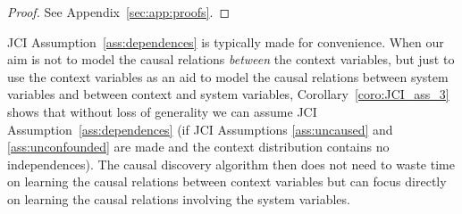 \documentclass[twoside,11pt]{article}
\begin{document}
\begin{corollary}\label{coro:JCI_ass_3}
\cmdCorollaryJCIAssC
\end{corollary}
\begin{proof}
  See Appendix~\ref{sec:app:proofs}.
\end{proof}
JCI Assumption~\ref{ass:dependences} is typically made for convenience.
When our aim is not to model the causal relations \emph{between} the context variables, but just to use the context variables as an aid to model the causal relations between system variables and between context and system variables, Corollary~\ref{coro:JCI_ass_3} shows that without loss of generality we can assume JCI Assumption~\ref{ass:dependences} (if JCI Assumptions \ref{ass:uncaused} and \ref{ass:unconfounded} are made and the context distribution contains no independences). The causal discovery algorithm then does not need to waste time on learning the causal relations between context variables but can focus directly on learning the causal relations involving the system variables.
\end{document}
